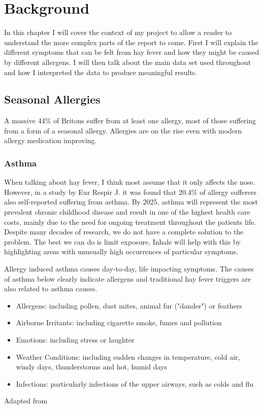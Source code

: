 \chapter{Background}
\label{cha:back}

In this chapter I will cover the context of my project to allow a reader to understand the more complex parts of the report to come. First I will explain the different symptoms that can be felt from hay fever and how they might be caused by different allergens. I will then talk about the main data set used throughout and how I interpreted the data to produce meaningful results.

\section{Seasonal Allergies}
A massive 44\% of Britons suffer from at least one allergy, most of those suffering from a form of a seasonal allergy. Allergies are on the rise even with modern allergy medication improving.
\cite{mintelallergy}

\subsection{Asthma}
When talking about hay fever, I think most assume that it only affects the nose. However, in a study by Eur Respir J. it was found that 20.4\% of allergy sufferers also self-reported suffering from asthma\cite{rhinitis}. By 2025, asthma will represent the most prevalent chronic childhood disease and result in one of the highest health care costs, mainly due to the need for ongoing treatment throughout the patients life\cite{childhood}. Despite many decades of research, we do not have a complete solution to the problem. The best we can do is limit exposure, Inhale will help with this by highlighting areas with unusually high occurrences of particular symptoms.

Allergy induced asthma causes day-to-day, life impacting symptoms. The causes of asthma below clearly indicate allergens and traditional hay fever triggers are also related to asthma causes.\\


\begin{itemize}
  \item Allergens: including pollen, dust mites, animal fur ("dander") or feathers
  \item Airborne Irritants: including cigarette smoke, fumes and pollution
  \item Emotions: including stress or laughter
  \item Weather Conditions: including sudden changes in temperature, cold air, windy days, thunderstorms and hot, humid days
  \item Infections: particularly infections of the upper airways, such as colds and flu
\end{itemize}\begin{center}Adapted from \cite{urlasthmacauses}\end{center}

